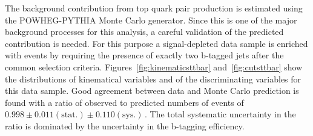The background contribution from top quark pair production is estimated using the POWHEG-PYTHIA Monte Carlo
generator. Since this is one of the major background processes for this analysis, a careful validation 
of the predicted contribution is needed. For this purpose a
signal-depleted data sample is enriched with \ttbar events  by requiring the presence of exactly two b-tagged jets after 
 the common selection criteria.
Figures~\ref{fig:kinematicsttbar} and~\ref{fig:cutsttbar} show the distributions  of kinematical variables and of the
 discriminating variables for this  data sample. Good agreement between data and Monte Carlo prediction is found with 
a ratio of  observed to predicted numbers of \ttbar events of $0.998 \pm 0.011\mathrm{(stat.)} \pm 0.110 \mathrm{(sys.)}\,.$
The total systematic uncertainty in the ratio is dominated by the uncertainty in the b-tagging efficiency. 
%




